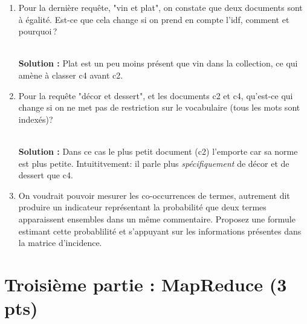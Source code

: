 \documentclass[10pt,a4paper]{article}
\newenvironment{solution}[0]{
~\\ \color{red} \textbf{Solution : }\color{black}}{%
}
\begin{document}
\begin{enumerate}
\begin{solution}
\begin{itemize}
  \item décor et dessert\,: 
  
    c2 : $\frac{1+1}{\sqrt{3}}$; 
    c4 :  $\frac{1+1}{\sqrt{3}}$  
    c5 : $\frac{1}{\sqrt{6}}$; 

  \item vin et plat
  
    c1 : $\frac{1+1}{\sqrt{2}}$; 
    c2 : $\frac{1}{\sqrt{3}}$;
    c3 :  $\frac{2}{\sqrt{3}}$  
    c4 :  $\frac{1}{\sqrt{3}}$  
    c5 : $\frac{1+2}{\sqrt{6}}$; 
    
 \end{itemize}

\end{solution}  

   \item Pour la dernière requête, "vin et plat", on constate que deux
     documents sont à égalité. Est-ce que cela change 
   si on prend en compte l'idf, comment et pourquoi\,?
   
\begin{solution}
Plat est un peu moins présent que vin dans la collection, ce qui amène à classer
c4 avant c2.
\end{solution}

   \item Pour la requête "décor et dessert", et les documents c2 et c4,
   qu'est-ce qui change si on ne met pas de restriction 
   sur le vocabulaire (tous les mots sont indexés)?
   
\begin{solution}
Dans ce cas le plus petit document (c2) l'emporte car sa norme est
plus petite. Intuititvement: il parle plus \emph{spécifiquement} de
décor et de dessert que c4.
\end{solution}   
    
\item On voudrait pouvoir mesurer les co-occurrences de termes, autrement dit
    produire un indicateur représentant la probabilité que deux termes
    apparaissent ensembles dans un même commentaire. Proposez une formule estimant
    cette probablilité et s'appuyant
      sur les informations présentes dans la matrice d'incidence.

\end{enumerate}


\section*{Troisième partie : MapReduce (3 pts)}
\end{document}
